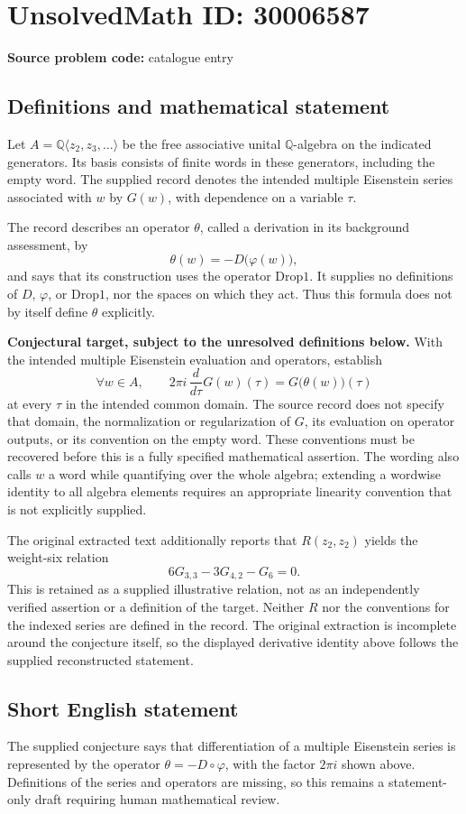 \documentclass[11pt]{article}
\newcommand{\Q}{\mathbb{Q}}
\begin{document}
\section*{UnsolvedMath ID: 30006587}
\textbf{Source problem code:} catalogue entry
\subsection{Definitions and mathematical statement}
Let \(A=\Q\langle z_2,z_3,\ldots\rangle\) be the free associative unital \(\Q\)-algebra on the indicated generators. Its basis consists of finite words in these generators, including the empty word. The supplied record denotes the intended multiple Eisenstein series associated with \(w\) by \(G(w)\), with dependence on a variable \(\tau\).

The record describes an operator \(\theta\), called a derivation in its background assessment, by
\[
\theta(w)=-D\bigl(\varphi(w)\bigr),
\]
and says that its construction uses the operator \(\mathrm{Drop1}\). It supplies no definitions of \(D\), \(\varphi\), or \(\mathrm{Drop1}\), nor the spaces on which they act. Thus this formula does not by itself define \(\theta\) explicitly.

\textbf{Conjectural target, subject to the unresolved definitions below.} With the intended multiple Eisenstein evaluation and operators, establish
\[
\forall w\in A,\qquad
2\pi i\,\frac{d}{d\tau}G(w)(\tau)
   =G\bigl(\theta(w)\bigr)(\tau)
\]
at every \(\tau\) in the intended common domain. The source record does not specify that domain, the normalization or regularization of \(G\), its evaluation on operator outputs, or its convention on the empty word. These conventions must be recovered before this is a fully specified mathematical assertion. The wording also calls \(w\) a word while quantifying over the whole algebra; extending a wordwise identity to all algebra elements requires an appropriate linearity convention that is not explicitly supplied.

The original extracted text additionally reports that \(R(z_2,z_2)\) yields the weight-six relation
\[
6G_{3,3}-3G_{4,2}-G_6=0.
\]
This is retained as a supplied illustrative relation, not as an independently verified assertion or a definition of the target. Neither \(R\) nor the conventions for the indexed series are defined in the record. The original extraction is incomplete around the conjecture itself, so the displayed derivative identity above follows the supplied reconstructed statement.
\subsection{Short English statement}
The supplied conjecture says that differentiation of a multiple Eisenstein series is represented by the operator \(\theta=-D\circ\varphi\), with the factor \(2\pi i\) shown above. Definitions of the series and operators are missing, so this remains a statement-only draft requiring human mathematical review.
\end{document}
